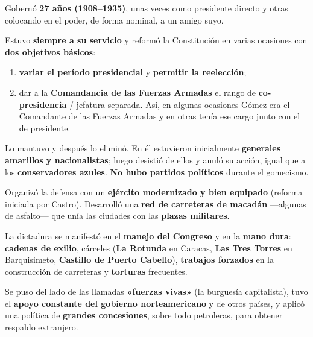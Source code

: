 \documentclass[12pt, letterpaper]{article}
\begin{document}
\begin{description}[leftmargin=1.2em, itemsep=5pt, style=nextline]
  \item[\textbf{a) La duración.}]
  Gobernó \textbf{27 años (1908--1935)}, unas veces como presidente directo y
  otras colocando en el poder, de forma nominal, a un amigo suyo.

  \item[\textbf{b) El Congreso.}]
  Estuvo \textbf{siempre a su servicio} y reformó la Constitución en varias
  ocasiones con \textbf{dos objetivos básicos}:
  \begin{enumerate}[leftmargin=*, itemsep=1pt, topsep=2pt]
    \item \textbf{variar el período presidencial} y \textbf{permitir la
          reelección};
    \item dar a la \textbf{Comandancia de las Fuerzas Armadas} el rango de
          \textbf{co-presidencia} / jefatura separada. Así, en algunas
          ocasiones Gómez era el Comandante de las Fuerzas Armadas y en otras
          tenía ese cargo junto con el de presidente.
  \end{enumerate}

  \item[\textbf{c) El Consejo de Gobierno.}]
  Lo mantuvo y después lo eliminó. En él estuvieron inicialmente
  \textbf{generales amarillos y nacionalistas}; luego desistió de ellos y anuló
  su acción, igual que a los \textbf{conservadores azules}.
  \textbf{No hubo partidos políticos} durante el gomecismo.

  \item[\textbf{d) La infraestructura del control.}]
  Organizó la defensa con un \textbf{ejército modernizado y bien equipado}
  (reforma iniciada por Castro). Desarrolló una \textbf{red de carreteras de
  macadán} ---algunas de asfalto--- que unía las ciudades con las
  \textbf{plazas militares}.

  \item[\textbf{e) Represión legal e ilegal.}]
  La dictadura se manifestó en el \textbf{manejo del Congreso} y en la
  \textbf{mano dura}: \textbf{cadenas de exilio}, cárceles
  (\textbf{La Rotunda} en Caracas, \textbf{Las Tres Torres} en Barquisimeto,
  \textbf{Castillo de Puerto Cabello}), \textbf{trabajos forzados} en la
  construcción de carreteras y \textbf{torturas} frecuentes.

  \item[\textbf{f) Las alianzas.}]
  Se puso del lado de las llamadas \textbf{«fuerzas vivas»} (la burguesía
  capitalista), tuvo el \textbf{apoyo constante del gobierno norteamericano} y
  de otros países, y aplicó una política de \textbf{grandes concesiones}, sobre
  todo petroleras, para obtener respaldo extranjero.
\end{description}
\end{document}
